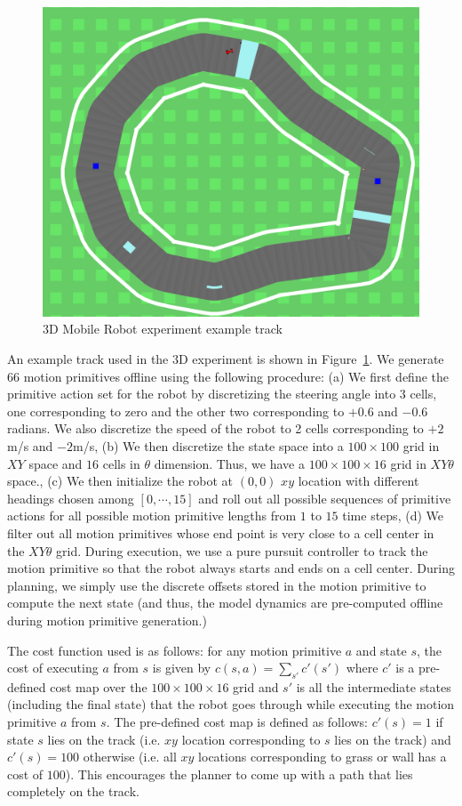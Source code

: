 \begin{figure}[t]
  \centering
  \includegraphics[width=0.5\linewidth]{figures/cmaxpp/race_track_full_pic.png}
  \caption{$3$D Mobile Robot experiment example track}
  \label{fig:track}
\end{figure}

An example track used in the $3$D experiment is shown in
Figure~\ref{fig:track}. We generate $66$ motion primitives offline
using the following procedure: (a) We first define the primitive
action set for the robot by discretizing the steering angle into 3
cells, one corresponding to zero and the other two corresponding to
$+0.6$ and $-0.6$ radians. We also discretize the speed of the robot
to 2 cells corresponding to $+2$m/s and $-2$m/s, (b) We then
discretize the state space into a $100\times 100$ grid in $XY$ space
and $16$ cells in $\theta$ dimension. Thus, we have a $100 \times 100
\times 16$ grid in $XY\theta$ space., (c) We then initialize the robot
at $(0, 0)$ $xy$ location with different headings chosen among $[0,
\cdots, 15]$ and roll out all possible sequences of primitive actions
for all possible motion primitive lengths from $1$ to $15$ time steps,
(d) We filter out all motion primitives whose end point is very close
to a cell center in the $XY\theta$ grid. During execution, we use a
pure pursuit controller to track the motion primitive so that the robot
always starts and ends on a cell center. During planning, we simply
use the discrete offsets stored in the motion primitive to compute the
next state (and thus, the model dynamics are pre-computed offline
during motion primitive generation.)

The cost function used is as follows: for any motion primitive $a$ and
state $s$,
the cost of executing $a$ from $s$ is given by $c(s, a) = \sum_{s'}
c'(s')$ where $c'$ is a pre-defined cost map over the $100 \times 100
\times 16$ grid and $s'$ is all the intermediate states (including the
final state) that the robot
goes through while executing the motion primitive $a$  from $s$. The
pre-defined cost map is defined as follows: $c'(s) = 1$ if state $s$
lies on the track (i.e. $xy$ location corresponding to $s$ lies on the
track) and $c'(s) = 100$ otherwise (i.e. all $xy$ locations
corresponding to grass or wall has a cost of $100$). This encourages
the planner to come up with a path that lies completely on the track.

